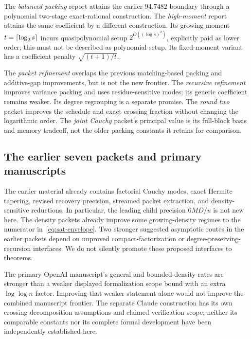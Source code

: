 \documentclass[11pt,letterpaper]{article}
\theoremstyle{remark}\newtheorem{remark}[theorem]{Remark}
\begin{document}
The \emph{balanced packing} report attains the earlier $94.7482$ boundary through a polynomial two-stage exact-rational construction. The \emph{high-moment} report attains the same coefficient by a different construction. Its growing moment $t=\left\lceil\log_2s\right\rceil$ incurs quasipolynomial setup $2^{O((\log s)^2)}$, explicitly paid as lower order; this must not be described as polynomial setup. Its fixed-moment variant has a coefficient penalty $\sqrt{(t+1)/t}$.

The \emph{packet refinement} overlaps the previous matching-based packing and additive-gap improvements, but is not the new frontier. The \emph{recursive refinement} improves variance packing and uses residue-sensitive modes; its generic coefficient remains weaker. Its degree regrouping is a separate promise. The \emph{round two} packet improves the schedule and exact crossing fraction without changing the logarithmic order. The \emph{joint Cauchy} packet's principal value is its full-block basis and memory tradeoff, not the older packing constants it retains for comparison.

\subsection{The earlier seven packets and primary manuscripts}
The earlier material already contains factorial Cauchy modes, exact Hermite tapering, revised recovery precision, streamed packet extraction, and density-sensitive reductions. In particular, the leading child precision $6MD/u$ is not new here. The density packets already improve some growing-density regimes to the numerator in~\eqref{eq:sat-envelope}. Two stronger suggested asymptotic routes in the earlier packets depend on unproved compact-factorization or degree-preserving-recursion interfaces. We do not silently promote these proposed interfaces to theorems.

The primary OpenAI manuscript's general and bounded-density rates are stronger than a weaker displayed formalization scope bound with an extra $\log\log n$ factor. Improving that weaker statement alone would not improve the combined manuscript frontier. The separate Claude construction has its own crossing-decomposition assumptions and claimed verification scope; neither its comparable constants nor its complete formal development have been independently established here.
\end{document}
